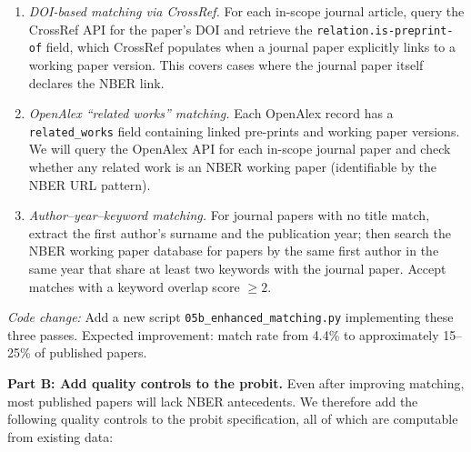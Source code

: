 \documentclass[12pt]{article}
\begin{document}
\begin{enumerate}
  \item \textit{DOI-based matching via CrossRef.}  For each in-scope
        journal article, query the CrossRef API for the paper's DOI and
        retrieve the \texttt{relation.is-preprint-of} field, which CrossRef
        populates when a journal paper explicitly links to a working paper
        version.  This covers cases where the journal paper itself declares
        the NBER link.

  \item \textit{OpenAlex ``related works'' matching.}  Each OpenAlex record
        has a \texttt{related\_works} field containing linked pre-prints and
        working paper versions.  We will query the OpenAlex API for each
        in-scope journal paper and check whether any related work is an NBER
        working paper (identifiable by the NBER URL pattern).

  \item \textit{Author--year--keyword matching.}  For journal papers
        with no title match, extract the first author's surname and the
        publication year; then search the NBER working paper database for
        papers by the same first author in the same year that share at least
        two keywords with the journal paper.  Accept matches with a keyword
        overlap score $\geq 2$.
\end{enumerate}

\textit{Code change:} Add a new script \texttt{05b\_enhanced\_matching.py}
implementing these three passes.  Expected improvement: match rate from
4.4\% to approximately 15--25\% of published papers.

\textbf{Part B: Add quality controls to the probit.}
Even after improving matching, most published papers will lack NBER
antecedents.  We therefore add the following quality controls to the probit
specification, all of which are computable from existing data:
\end{document}
